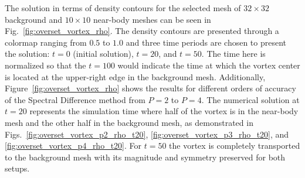 The solution in terms of density contours for the selected mesh of $32 \times 32$ background and $10 \times 10$ near-body meshes can be seen in Fig.\ \ref{fig:overset_vortex_rho}. The density contours are presented through a colormap ranging from $0.5$ to $1.0$ and three time periods are chosen to present the solution: $t=0$ (initial solution), $t=20$, and $t=50$. The time here is normalized so that the $t=100$ would indicate the time at which the vortex center is located at the upper-right edge in the background mesh. Additionally, Figure\ \ref{fig:overset_vortex_rho} shows the results for different orders of accuracy of the Spectral Difference method from $P=2$ to $P=4$. The numerical solution at $t=20$ represents the simulation time where half of the vortex is in the near-body mesh and the other half in the background mesh, as demonstrated in Figs.\ \ref{fig:overset_vortex_p2_rho_t20}, \ref{fig:overset_vortex_p3_rho_t20}, and \ref{fig:overset_vortex_p4_rho_t20}. For $t=50$ the vortex is completely transported to the background mesh with its magnitude and symmetry preserved for both setups.
